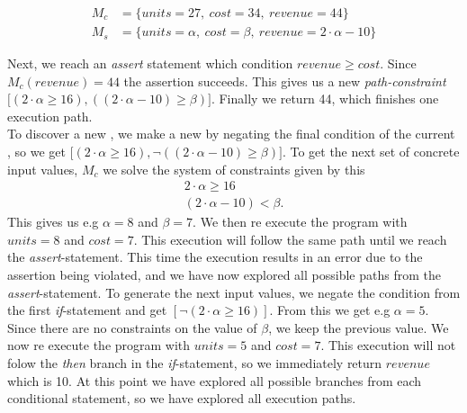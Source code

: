 \begin{align*}
	M_c & = \{units = 27, \ cost = 34, \ revenue = 44 \}\\
	M_s & = \{ units = \alpha, \ cost = \beta, \ revenue = 2 \cdot \alpha - 10 \}
\end{align*}

Next, we reach an \textsl{assert} statement which condition $revenue \geq cost$. Since $M_c(revenue) = 44$ the assertion succeeds. This gives us a new \emph{path-constraint} $\lbrack (2\cdot \alpha \geq 16) , ((2\cdot \alpha - 10) \geq \beta) \rbrack$. Finally we return 44, which finishes one execution path.\\
To discover a new \pc, we make a new \pc by negating the final condition of the current \pc, so we get $\lbrack (2\cdot \alpha \geq 16), \neg ((2\cdot \alpha - 10) \geq \beta) \rbrack$. To get the next set of concrete input values, $M_c$ we solve the system of constraints given by this \pc
\begin{align*}
	2\cdot \alpha \geq 16\\
	(2\cdot \alpha - 10) < \beta.
\end{align*}
This gives us e.g $\alpha = 8$ and $\beta = 7$. 
We then re execute the program with $units = 8$ and $cost = 7$. This execution will follow the same path until we reach the \textsl{assert}-statement. This time the execution results in an error due to the assertion being violated, and we have now explored all possible paths from the \textsl{assert}-statement. To generate the next input values, we negate the condition from the first \textsl{if}-statement and get $[\neg (2\cdot \alpha \geq 16)]$. From this we get e.g $\alpha = 5$. Since there are no constraints on the value of $\beta$, we keep the previous value.  We now re execute the program with $units = 5$ and $cost = 7$. This execution will not folow the \textsl{then} branch in the \textsl{if}-statement, so we immediately return $revenue$ which is 10. At this point we have explored all possible branches from each conditional statement, so we have explored all execution paths. 

